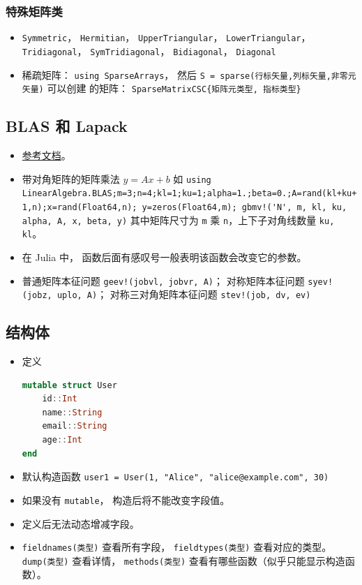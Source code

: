 \subsubsection{特殊矩阵类}
\begin{itemize}
\item \verb`Symmetric`， \verb`Hermitian`， \verb`UpperTriangular`， \verb`LowerTriangular`， \verb`Tridiagonal`， \verb`SymTridiagonal`， \verb`Bidiagonal`， \verb`Diagonal`
\item 稀疏矩阵： \verb`using SparseArrays`， 然后 \verb`S = sparse(行标矢量,列标矢量,非零元矢量)` 可以创建 的矩阵： \verb`SparseMatrixCSC{矩阵元类型, 指标类型}`
\end{itemize}

\subsection{BLAS 和 Lapack}
\begin{itemize}
\item \href{https://docs.julialang.org/en/v1/stdlib/LinearAlgebra/}{参考文档}。
\item 带对角矩阵的矩阵乘法 $y = Ax+b$ 如 \verb`using LinearAlgebra.BLAS;m=3;n=4;kl=1;ku=1;alpha=1.;beta=0.;A=rand(kl+ku+1,n);x=rand(Float64,n); y=zeros(Float64,m); gbmv!('N', m, kl, ku, alpha, A, x, beta, y)` 其中矩阵尺寸为 \verb`m` 乘 \verb`n`，上下子对角线数量 \verb`ku, kl`。
\item 在 Julia 中， 函数后面有感叹号一般表明该函数会改变它的参数。
\item 普通矩阵本征问题 \verb`geev!(jobvl, jobvr, A)`； 对称矩阵本征问题 \verb`syev!(jobz, uplo, A)`； 对称三对角矩阵本征问题 \verb`stev!(job, dv, ev)`
\end{itemize}

\subsection{结构体}
\begin{itemize}
\item 定义
\begin{lstlisting}[language=julia]
mutable struct User
    id::Int
    name::String
    email::String
    age::Int
end
\end{lstlisting}
\item 默认构造函数 \verb`user1 = User(1, "Alice", "alice@example.com", 30)`
\item 如果没有 \verb`mutable`， 构造后将不能改变字段值。
\item 定义后无法动态增减字段。
\item \verb`fieldnames(类型)` 查看所有字段， \verb`fieldtypes(类型)` 查看对应的类型。 \verb`dump(类型)` 查看详情， \verb`methods(类型)` 查看有哪些函数（似乎只能显示构造函数）。
\end{itemize}

